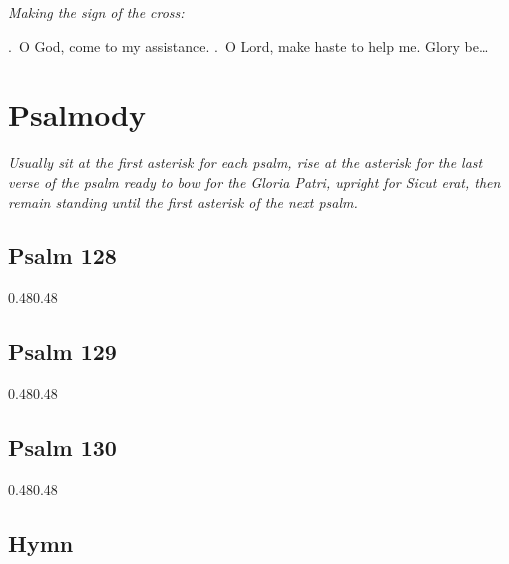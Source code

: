 \documentclass[12pt,a5paper]{memoir}
\newcommand{\rubrics}[1]{\noindent\textit{#1}}
\newcommand{\setupParallel}{\begin{Parallel}{0.48\textwidth}{0.48\textwidth}}
\begin{document}
\rubrics{Making the sign of the cross:}



\Vbar.\ O God, come to my assistance.
\Rbar.\ O Lord, make haste to help me.
Glory be\ldots

\section*{Psalmody}

\rubrics{Usually sit at the first asterisk for each psalm, rise at the asterisk for the last verse of the psalm ready to bow for the \emph{Gloria Patri}, upright for \emph{Sicut erat}, then remain standing until the first asterisk of the next psalm.}

\subsection*{Psalm 128}


\setupParallel

\end{Parallel}

\subsection*{Psalm 129}


\setupParallel

\end{Parallel}


\subsection*{Psalm 130}


\setupParallel

\end{Parallel}


\subsection{Hymn}

\end{document}
